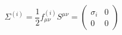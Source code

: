 \begin{equation}
\Sigma^{(i)}=\frac{1}{2}f^{(i)}_{\mu\nu}S^{\mu\nu}=\left(
\begin{array}{cc}
\sigma_i&0\\
0&0
\end{array}\right)
\end{equation}

